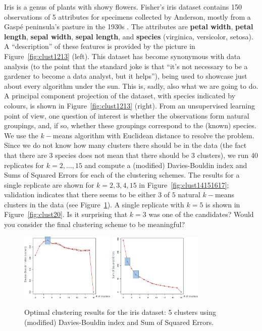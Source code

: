 \afterpage{\FloatBarrier}
Iris is a genus of plants with showy flowers. Fisher's iris dataset contains 150 observations of 5 attributes for specimens collected by Anderson, mostly from a Gasp\'e peninsula's pasture in the 1930s \cite{DSML_CL21}. The attributes are \textbf{petal width}, \textbf{petal length}, \textbf{sepal width}, \textbf{sepal length}, and \textbf{species} (virginica, versicolor, setosa). A ``description'' of these features is provided by the picture in Figure~\ref{fig:clust1213} (left). This dataset has become synonymous with data analysis (to the point that the standard joke is that ``it's not necessary to be a gardener to become a data analyst, but it helps''), being used to showcase just about every algorithm under the sun. This is, sadly, also what we are going to do. \newl A principal component projection of the dataset, with species indicated by colours, is shown in Figure~\ref{fig:clust1213} (right). From an unsupervised learning point of view, one question of interest is whether the observations form natural groupings, and, if so, whether these groupings correspond to the (known) species. \newl We use the $k-$means algorithm with Euclidean distance to resolve the problem. Since we do not know how many clusters there should be in the data (the fact that there are 3 species does not mean that there should be 3 clusters), we run 40 replicates for $k=2, \ldots, 15$ and compute a (modified) Davies-Bouldin index and Sums of Squared Errors for each of the clustering schemes. The results for a single replicate are shown for $k=2,3,4,15$ in Figure~\ref{fig:clust14151617}; validation indicates that there seems to be either $3$ of $5$ natural $k-$means clusters in the data (see Figure~\ref{fig:clust1819}). A single replicate with $k=5$ is shown in Figure~\ref{fig:clust20}. Is it surprising that $k=3$ was one of the candidates? Would you consider the final clustering scheme to be meaningful? 
\begin{figure}[t]
\centering
\includegraphics[width=0.40\textwidth]{images/DSML/clustering18.png}
\includegraphics[width=0.40\textwidth]{images/DSML/clustering19.png} \caption[\small Optimal clustering results for the iris dataset: DBI, SSE]{\small Optimal clustering results for the iris dataset: 5 clusters using (modified) Davies-Bouldin index and Sum of Squared Errors.}\label{fig:clust1819}
\end{figure}
